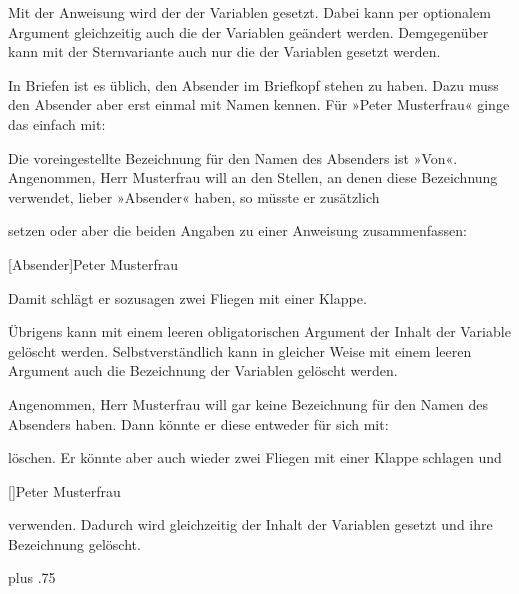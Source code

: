 \begin{Declaration}
\end{Declaration}
Mit der Anweisung  wird der  der Variablen
 gesetzt. Dabei kann per optionalem Argument gleichzeitig auch die
 der Variablen geändert werden. Demgegenüber kann mit der
Sternvariante  auch nur die  der
Variablen  gesetzt werden.
\begin{Example}
  In Briefen ist es üblich, den Absender im Briefkopf stehen zu haben. Dazu
  muss \KOMAScript{} den Absender aber erst einmal mit Namen kennen. Für
  »Peter Musterfrau« ginge das einfach mit:
\begin{lstcode}
\end{lstcode}
  Die voreingestellte Bezeichnung für den Namen des Absenders ist
  »Von«. Angenommen, Herr Musterfrau will %
  \iffalse aber \fi %
  an den Stellen, an denen \KOMAScript{} diese Bezeichnung verwendet, lieber
  »Absender« haben, so müsste er zusätzlich
\begin{lstcode}
\end{lstcode}
  setzen oder aber die beiden Angaben zu einer Anweisung zusammenfassen:
\begin{lstcode}
  [Absender]{Peter Musterfrau}
\end{lstcode}
  Damit schlägt er sozusagen zwei Fliegen mit einer Klappe.
\end{Example}
Übrigens kann mit einem leeren obligatorischen Argument 
der Inhalt der Variable gelöscht werden. Selbstverständlich kann in
gleicher Weise mit einem leeren Argument  auch die
Bezeichnung der Variablen gelöscht werden.
\begin{Example}
  Angenommen, Herr Musterfrau will gar keine Bezeichnung für den Namen des
  Absenders haben. Dann könnte er diese entweder für sich mit:
\begin{lstcode}
\end{lstcode}
  löschen. Er könnte aber auch wieder zwei Fliegen mit einer Klappe
  schlagen und
\begin{lstcode}
  []{Peter Musterfrau}
\end{lstcode}
  verwenden. Dadurch wird gleichzeitig der Inhalt der Variablen gesetzt und
  ihre Bezeichnung gelöscht.
\end{Example}
%
\EndIndexGroup
{}\ht\strutbox plus .75\strutbox%

